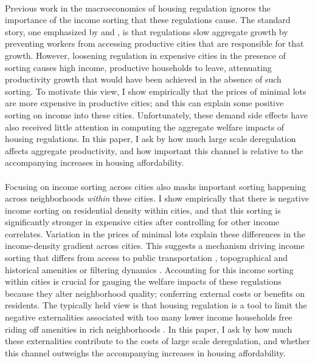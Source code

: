 \documentclass[11pt]{article}
\begin{document}
	\paragraph*{}
	Previous work in the macroeconomics of housing regulation ignores the importance of the income sorting that these regulations cause. The standard story, one emphasized by \cite{hseihmoretti} and \cite{durantonpugaurbgrowth}, is that regulations slow aggregate growth by preventing workers from accessing productive cities that are responsible for that growth. However, loosening regulation in expensive cities in the presence of sorting causes high income, productive households to leave, attenuating productivity growth that would have been achieved in the absence of such sorting. To motivate this view, I show empirically that the prices of minimal lots are more expensive in productive cities; and this can explain some positive sorting on income into these cities. Unfortunately, these demand side effects have also received little attention in computing the aggregate welfare impacts of housing regulations. In this paper, I ask by how much large scale deregulation affects aggregate productivity, and how important this channel is relative to the accompanying increases in housing affordability. 
	  
	
	\paragraph*{} 
	Focusing on income sorting across cities also masks important sorting happening across neighborhoods \textit{within} these cities. I show empirically that there is negative income sorting on residential density within cities, and that this sorting is significantly stronger in expensive cities after controlling for other income correlates. Variation in the prices of minimal lots explain these differences in the income-density gradient across cities. This suggests a mechanism driving income sorting that differs from access to public transportation \citep{ccpoortransport}, topographical and historical amenities \citep{parispoor} or filtering dynamics \citep{Gentrificationcycles}. Accounting for this income sorting within cities is crucial for gauging the welfare impacts of these regulations because they alter neighborhood quality; conferring external costs or benefits on residents. The typically held view is that housing regulation is a tool to limit the negative externalities associated with too many lower income households free riding off amenities in rich neighborhoods \citep{calabresetal, Hamilton1975}. In this paper, I ask by how much these externalities contribute to the costs of large scale deregulation, and whether this channel outweighs the accompanying increases in housing affordability.  
		
\end{document}
